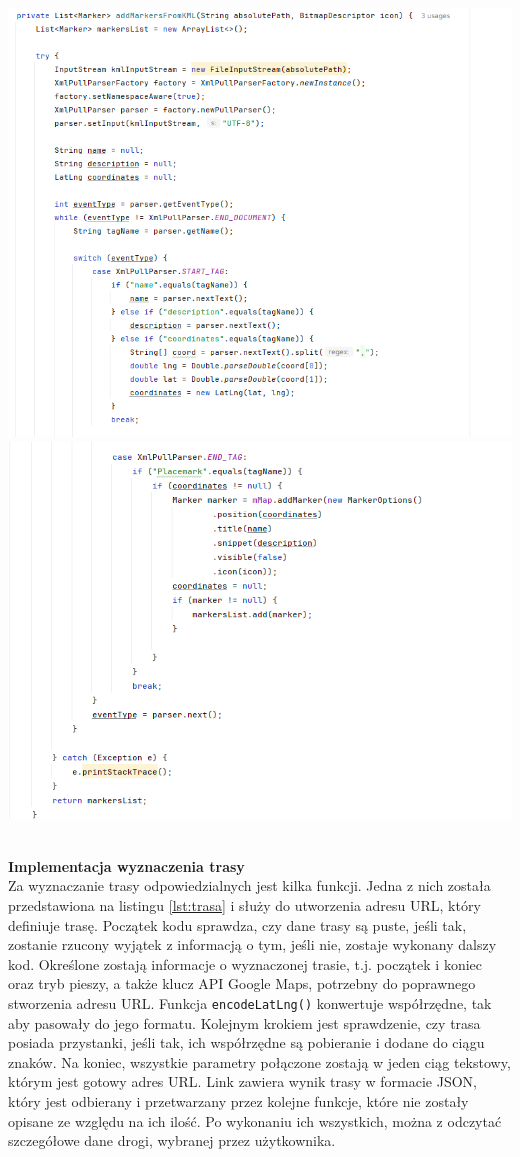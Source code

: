 \noindent
\begin{minipage}{\linewidth}
    \label{lst:schron}
    \centering
    \includegraphics[width=0.8\linewidth]{img/kod/schroniska1.png}
    \includegraphics[width=0.8\linewidth]{img/kod/schroniska2.png}
\end{minipage}\\


\textbf{Implementacja wyznaczenia trasy}\\

Za wyznaczanie trasy odpowiedzialnych jest kilka funkcji. Jedna z nich została przedstawiona na listingu \ref{lst:trasa} i służy do utworzenia adresu URL, który definiuje trasę. Początek kodu sprawdza, czy dane trasy są puste, jeśli tak, zostanie rzucony wyjątek z informacją o tym, jeśli nie, zostaje wykonany dalszy kod. Określone zostają informacje o wyznaczonej trasie, t.j. początek i koniec oraz tryb pieszy, a także klucz API Google Maps, potrzebny do poprawnego stworzenia adresu URL. Funkcja \verb|encodeLatLng()| konwertuje współrzędne, tak aby pasowały do jego formatu. Kolejnym krokiem jest sprawdzenie, czy trasa posiada przystanki, jeśli tak, ich współrzędne są pobieranie i dodane do ciągu znaków. Na koniec, wszystkie parametry połączone zostają w jeden ciąg tekstowy, którym jest gotowy adres URL. Link zawiera wynik trasy w formacie JSON, który jest odbierany i przetwarzany przez kolejne funkcje, które nie zostały opisane ze względu na ich ilość. Po wykonaniu ich wszystkich, można z odczytać szczegółowe dane drogi, wybranej przez użytkownika. \\

